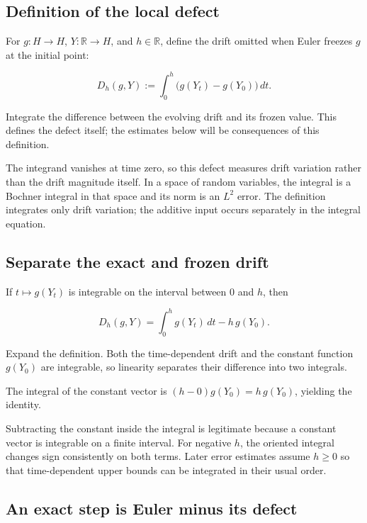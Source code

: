 \documentclass[11pt,a4paper]{article}
\begin{document}
\subsection{\texorpdfstring{Definition of the local defect}{Definition of the local defect}}


For \(g:H\to H\), \(Y:\mathbb R\to H\), and \(h\in\mathbb R\), define the drift omitted when Euler freezes \(g\) at the initial point:

\[D_h(g,Y):=\int_0^h\bigl(g(Y_t)-g(Y_0)\bigr)\,dt.\]

Integrate the difference between the evolving drift and its frozen value. This defines the defect itself; the estimates below will be consequences of this definition.



The integrand vanishes at time zero, so this defect measures drift variation rather than the drift magnitude itself. In a space of random variables, the integral is a Bochner integral in that space and its norm is an \(L^2\) error. The definition integrates only drift variation; the additive input occurs separately in the integral equation.


\subsection{\texorpdfstring{Separate the exact and frozen drift}{Separate the exact and frozen drift}}


If \(t\mapsto g(Y_t)\) is integrable on the interval between \(0\) and \(h\), then

\[D_h(g,Y)=\int_0^h g(Y_t)\,dt-h\,g(Y_0).\]

Expand the definition. Both the time-dependent drift and the constant function \(g(Y_0)\) are integrable, so linearity separates their difference into two integrals.



The integral of the constant vector is \((h-0)g(Y_0)=h\,g(Y_0)\), yielding the identity.



Subtracting the constant inside the integral is legitimate because a constant vector is integrable on a finite interval. For negative \(h\), the oriented integral changes sign consistently on both terms. Later error estimates assume \(h\ge0\) so that time-dependent upper bounds can be integrated in their usual order.


\subsection{\texorpdfstring{An exact step is Euler minus its defect}{An exact step is Euler minus its defect}}
\end{document}
